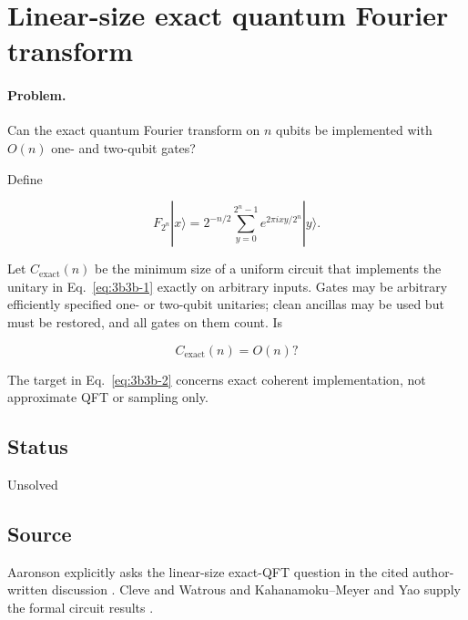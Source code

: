 \section{Linear-size exact quantum Fourier transform}
\label{sec:op_3b3bfcda365a83a9}

\paragraph{Problem.}
Can the exact quantum Fourier transform on $n$ qubits be implemented with $O(n)$ one- and two-qubit gates?

Define

\begin{equation}
F_{2^n}|x\rangle=2^{-n/2}\sum_{y=0}^{2^n-1}e^{2\pi ixy/2^n}|y\rangle.
\label{eq:3b3b-1}
\end{equation}

Let $C_{\mathrm{exact}}(n)$ be the minimum size of a uniform circuit that implements the unitary in Eq.~\eqref{eq:3b3b-1} exactly on arbitrary inputs. Gates may be arbitrary efficiently specified one- or two-qubit unitaries; clean ancillas may be used but must be restored, and all gates on them count. Is

\begin{equation}
C_{\mathrm{exact}}(n)=O(n)?
\label{eq:3b3b-2}
\end{equation}

The target in Eq.~\eqref{eq:3b3b-2} concerns exact coherent implementation, not approximate QFT or sampling only.

\subsection*{Status}

Unsolved

\subsection*{Source}

Aaronson explicitly asks the linear-size exact-QFT question in the cited author-written discussion . Cleve and Watrous and Kahanamoku--Meyer and Yao supply the formal circuit results .

